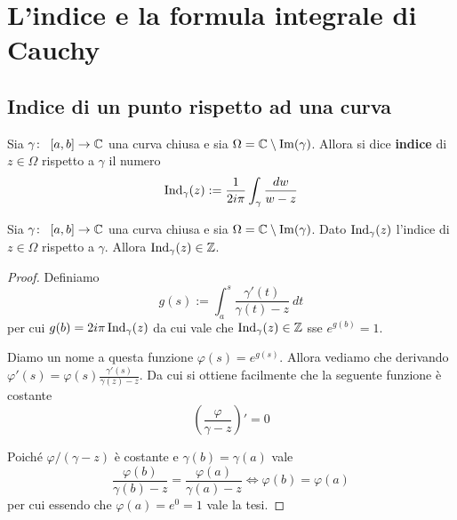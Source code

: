 \section{L'indice e la formula integrale di Cauchy}
\subsection{\textcolor{AnComp}{\textbf{Indice di un punto rispetto ad una curva}}}
\begin{definition}
  \label{def:indice-in-z}
  Sia $\gamma \colon\ \left[ a,b \right] \rightarrow \mathbb{C}$ una curva chiusa e sia
  $\Omega = \mathbb{C} \setminus \operatorname{Im}(\gamma)$. Allora si dice \textbf{indice} di
  $z \in \Omega$ rispetto a $\gamma$ il numero 
  \begin{equation*}
    \operatorname{Ind}_\gamma(z) := \frac{1}{2i\pi} \int_\gamma
    \frac{dw}{w-z}
  \end{equation*}
\end{definition}

\begin{lemma}
  Sia $\gamma \colon\ \left[ a,b \right] \rightarrow \mathbb{C}$ una curva chiusa e sia
  $\Omega = \mathbb{C} \setminus \operatorname{Im}(\gamma)$. Dato $\operatorname{Ind}_\gamma(z)$
  l'indice di $z \in \Omega$ rispetto a $\gamma$. Allora
  $\operatorname{Ind}_\gamma(z) \in \mathbb{Z}$.
  \label{lem:index-is-natural-number}
\end{lemma}
\begin{proof}
  Definiamo 
  \begin{equation*}
    g(s) := \int^{s}_{a} \frac{\gamma'(t)}{\gamma(t) - z} \ dt
  \end{equation*}
  per cui $g(b) = 2i\pi\operatorname{Ind}_\gamma(z)$ da cui vale che
  $\operatorname{Ind}_\gamma(z) \in \mathbb{Z}$ sse $e^{g(b)} = 1$. 
  
  Diamo un nome a questa funzione $\varphi(s) = e^{g(s)}$. Allora vediamo
  che derivando $\varphi'(s) = \varphi(s) \frac{\gamma'(s)}{\gamma(z) - z}$.
  Da cui si ottiene facilmente che la seguente funzione è costante
  \begin{equation*}
    \left(\frac{\varphi}{\gamma - z}\right)' = 0
  \end{equation*}

  Poiché $\varphi/(\gamma - z)$ è costante e $\gamma(b) = \gamma(a)$ vale 
  \begin{equation*}
    \frac{\varphi(b)}{\gamma(b) - z} = \frac{\varphi(a)}{\gamma(a) - z}
    \Longleftrightarrow \varphi(b) = \varphi(a)
  \end{equation*}
  per cui essendo che $\varphi(a) = e^0 = 1$ vale la tesi.
\end{proof}

